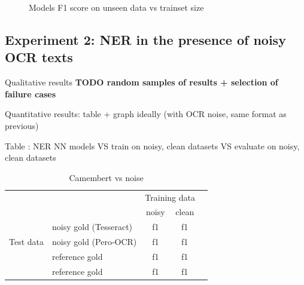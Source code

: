 \begin{figure}[htb!]
	  \vspace{3in}
	  \caption{\label{fig:f1-vs-trainsize} Models F1 score on unseen data vs trainset size}
\end{figure}
	                                        


\subsection{Experiment 2: NER in the presence of noisy OCR texts}

Qualitative results
\textbf{TODO random samples of results + selection of failure cases}

Quantitative results: table + graph ideally (with OCR noise, same format as previous)

Table : NER NN models VS train on {noisy, clean} datasets VS evaluate on {noisy, clean} datasets


\begin{table}[h!]
\caption{Camembert vs noise}
\centering
\begin{tabular}{ll|cc|c}
 & & \multicolumn{2}{c|}{Training data} & \\
 & & noisy & clean &   \\ 
\cline{1-4}
\multirow{3}{*}{Test data}& noisy gold (Tesseract) & f1 & f1 & \\
                            & noisy gold (Pero-OCR) & f1 & f1 & \\ 
                            & reference gold & f1 & f1 & \\ 
                            & reference gold & f1 & f1 & \\
\cline{1-4}
\end{tabular}
\end{table}



